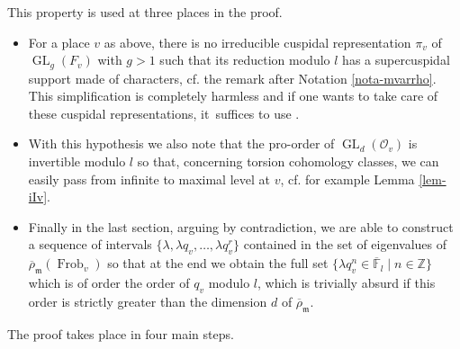 \documentclass[11pt]{article}
\newcommand{\cf}{cf.\xspace}
\let\sep\mid
\DeclareMathOperator{\GL}{GL}
\theoremstyle{plain}
\theoremstyle{definition}
\numberwithin{equation}{subsection}
\newcommand\Fm{{\mathbb F}}
\newcommand\Zm{{\mathbb Z}}
\newcommand\OC{{\mathcal O}}
\DeclareMathOperator{\frob}{Frob}
\begin{document}
This property is used at three places in the proof.
\begin{itemize}
\item For a place $v$ as above, there is no irreducible cuspidal representation
$\pi_v$ of $\GL_g(F_v)$ with $g>1$ such that its reduction modulo $l$ has a supercuspidal
support made of characters, \cf the remark after Notation \ref{nota-mvarrho}.
This simplification is completely harmless and if one wants to take care of
these cuspidal representations, it~suffices to use \cite[Prop.\,2.4.1]{boyer-duke}.

\item With this hypothesis we also note that the pro-order of $\GL_d(\OC_v)$ is invertible
modulo $l$ so that, concerning torsion cohomology classes,
we can easily pass from infinite to maximal level at $v$, \cf for example Lemma \ref{lem-iIv}.

\item Finally in the last section, arguing by contradiction,
we are able to construct a sequence of intervals
$\{\lambda, \lambda q_v,\dots, \lambda q_v^{r}\}$ contained in the set of eigenvalues of
$\overline \rho_{\mathfrak m}(\frob_v)$ so that at the end we obtain the full set
$\{\lambda q_v^n \in \overline \Fm_l\sep n \in \Zm\}$ which is of order the order of $q_v$ modulo $l$, which
is trivially absurd if this order is strictly greater than the dimension $d$ of
$\overline \rho_{\mathfrak m}$.
\end{itemize}

The proof takes place in four main steps.
\end{document}
